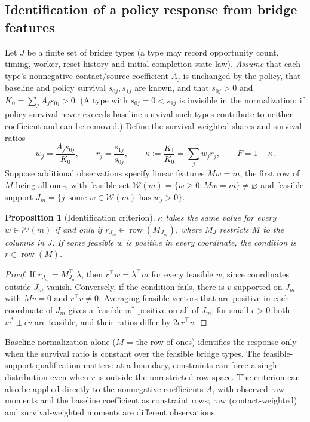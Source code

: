 \documentclass[11pt]{article}
\newtheorem{proposition}{Proposition}
\begin{document}
\subsection{Identification of a policy response from bridge features}\label{sec:s-proof-ident}
Let $J$ be a finite set of bridge types (a type may record opportunity count,
timing, worker, reset history and initial completion-state law). \emph{Assume}
that each type's nonnegative contact/source coefficient $A_j$ is unchanged by the
policy, that baseline and policy survival $s_{0j},s_{1j}$ are known, and that
$s_{0j}>0$ and $K_0=\sum_jA_js_{0j}>0$. (A type with $s_{0j}=0<s_{1j}$ is invisible
in the normalization; if policy survival never exceeds baseline survival such
types contribute to neither coefficient and can be removed.) Define the
survival-weighted shares and survival ratios
\begin{equation}\label{eq:weights}
w_j=\frac{A_js_{0j}}{K_0},\qquad r_j=\frac{s_{1j}}{s_{0j}},\qquad
\kappa:=\frac{K_1}{K_0}=\sum_jw_jr_j,\qquad F=1-\kappa.
\end{equation}
Suppose additional observations specify linear features $Mw=m$, the first row of
$M$ being all ones, with feasible set $\mathcal W(m)=\{w\ge0:Mw=m\}\ne\varnothing$
and feasible support $J_m=\{j:\text{some }w\in\mathcal W(m)\text{ has }w_j>0\}$.

\begin{proposition}[Identification criterion]\label{prop:ident}
$\kappa$ takes the same value for every $w\in\mathcal W(m)$ if and only if
$r_{J_m}\in\operatorname{row}(M_{J_m})$, where $M_{J}$ restricts $M$ to the columns
in $J$. If some feasible $w$ is positive in every coordinate, the condition is
$r\in\operatorname{row}(M)$.
\end{proposition}
\begin{proof}
If $r_{J_m}=M_{J_m}^{\top}\lambda$, then $r^{\top}w=\lambda^{\top}m$ for every
feasible $w$, since coordinates outside $J_m$ vanish. Conversely, if the
condition fails, there is $v$ supported on $J_m$ with $Mv=0$ and $r^{\top}v\ne0$.
Averaging feasible vectors that are positive in each coordinate of $J_m$ gives a
feasible $w^*$ positive on all of $J_m$; for small $\epsilon>0$ both
$w^*\pm\epsilon v$ are feasible, and their ratios differ by $2\epsilon r^{\top}v$.
\end{proof}
Baseline normalization alone ($M$ = the row of ones) identifies the response only
when the survival ratio is constant over the feasible bridge types. The
feasible-support qualification matters: at a boundary, constraints can force a
single distribution even when $r$ is outside the unrestricted row space. The
criterion can also be applied directly to the nonnegative coefficients $A$, with
observed raw moments and the baseline coefficient as constraint rows; raw
(contact-weighted) and survival-weighted moments are different observations.
\end{document}
